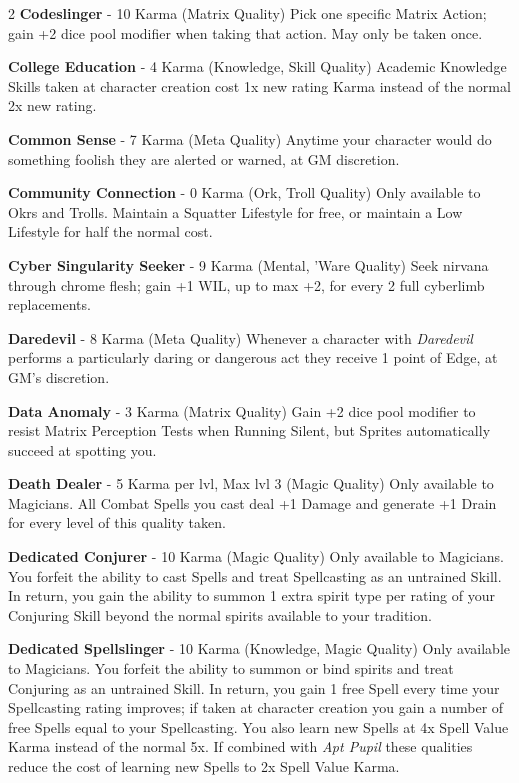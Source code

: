 \documentclass[
  oneside]{article}
\begin{document}
\begin{multicols}{2}
\textbf{Codeslinger} - 10 Karma (Matrix Quality)
Pick one specific Matrix Action; gain +2 dice pool
modifier when taking that action. May only be
taken once.

\textbf{College Education} - 4 Karma (Knowledge,
Skill Quality) Academic Knowledge Skills taken at
character creation cost 1x new rating Karma
instead of the normal 2x new rating.

\textbf{Common Sense} - 7 Karma (Meta Quality)
Anytime your character would do something foolish
they are alerted or warned, at GM discretion.

\textbf{Community Connection} - 0 Karma (Ork,
Troll Quality) Only available to Okrs and Trolls.
Maintain a Squatter Lifestyle for free, or
maintain a Low Lifestyle for half the normal cost.

\textbf{Cyber Singularity Seeker} - 9 Karma
(Mental, 'Ware Quality) Seek nirvana through
chrome flesh; gain +1 WIL, up to max +2, for every
2 full cyberlimb replacements.

\textbf{Daredevil} - 8 Karma (Meta Quality)
Whenever a character with \emph{Daredevil}
performs a particularly daring or dangerous act
they receive 1 point of Edge, at GM's discretion.

\textbf{Data Anomaly} - 3 Karma (Matrix Quality)
Gain +2 dice pool modifier to resist Matrix
Perception Tests when Running Silent, but Sprites
automatically succeed at spotting you.

\textbf{Death Dealer} - 5 Karma per lvl, Max lvl 3
(Magic Quality) Only available to Magicians. All
Combat Spells you cast deal +1 Damage and generate
+1 Drain for every level of this quality taken.

\textbf{Dedicated Conjurer} - 10 Karma (Magic
Quality) Only available to Magicians. You forfeit
the ability to cast Spells and treat Spellcasting
as an untrained Skill. In return, you gain the
ability to summon 1 extra spirit type per rating
of your Conjuring Skill beyond the normal spirits
available to your tradition.

\textbf{Dedicated Spellslinger} - 10 Karma
(Knowledge, Magic Quality) Only available to
Magicians. You forfeit the ability to summon or
bind spirits and treat Conjuring as an untrained
Skill. In return, you gain 1 free Spell every time
your Spellcasting rating improves; if taken at
character creation you gain a number of free
Spells equal to your Spellcasting. You also learn
new Spells at 4x Spell Value Karma instead of the
normal 5x. If combined with \emph{Apt Pupil} these
qualities reduce the cost of learning new Spells
to 2x Spell Value Karma.


\end{multicols}
\end{document}
